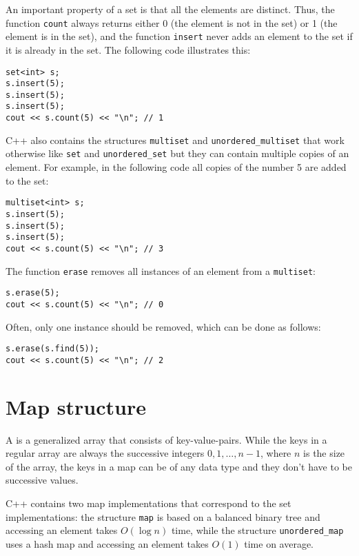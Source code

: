 An important property of a set is
that all the elements are distinct.
Thus, the function \texttt{count} always returns
either 0 (the element is not in the set)
or 1 (the element is in the set),
and the function \texttt{insert} never adds
an element to the set if it is
already in the set.
The following code illustrates this:

\begin{lstlisting}
set<int> s;
s.insert(5);
s.insert(5);
s.insert(5);
cout << s.count(5) << "\n"; // 1
\end{lstlisting}


C++ also contains the structures
\texttt{multiset} and \texttt{unordered\_multiset}
that work otherwise like \texttt{set}
and \texttt{unordered\_set}
but they can contain multiple copies of an element.
For example, in the following code all copies
of the number 5 are added to the set:

\begin{lstlisting}
multiset<int> s;
s.insert(5);
s.insert(5);
s.insert(5);
cout << s.count(5) << "\n"; // 3
\end{lstlisting}
The function \texttt{erase} removes
all instances of an element
from a \texttt{multiset}:
\begin{lstlisting}
s.erase(5);
cout << s.count(5) << "\n"; // 0
\end{lstlisting}
Often, only one instance should be removed,
which can be done as follows:
\begin{lstlisting}
s.erase(s.find(5));
cout << s.count(5) << "\n"; // 2
\end{lstlisting}

\section{Map structure}


A  is a generalized array
that consists of key-value-pairs.
While the keys in a regular array are always
the successive integers $0,1,\ldots,n-1$,
where $n$ is the size of the array,
the keys in a map can be of any data type and
they don't have to be successive values.

C++ contains two map implementations that
correspond to the set implementations:
the structure
\texttt{map} is based on a balanced
binary tree and accessing an element
takes $O(\log n)$ time,
while the structure
\texttt{unordered\_map} uses a hash map
and accessing an element takes $O(1)$ time on average.


